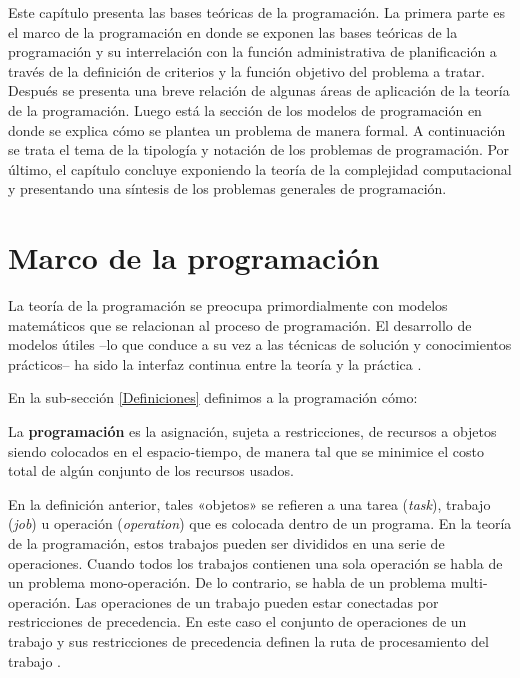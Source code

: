 \documentclass[spanish,draft,12pt,headsepline,footsepline,paper=letter]{scrreprt}
\renewenvironment{quotation}{\list{}{\leftmargin=0.25in}\item[]}{\endlist}
\begin{document}
Este capítulo presenta las bases teóricas de la programación. La primera parte es el marco de la programación en donde se exponen las bases teóricas de la programación y su interrelación con la función administrativa de planificación a través de la definición de criterios y la función objetivo del problema a tratar. Después se presenta una breve relación de algunas áreas de aplicación de la teoría de la programación. Luego está la sección de los modelos de programación en donde se explica cómo se plantea un problema de manera formal. A continuación se trata el tema de la tipología y notación de los problemas de programación. Por último, el capítulo concluye exponiendo la teoría de la complejidad computacional y presentando una síntesis de los problemas generales de programación.

\section{Marco de la programación}

La teoría de la programación se preocupa primordialmente con modelos matemáticos que se relacionan al proceso de programación. El desarrollo de modelos útiles –lo que conduce a su vez a las técnicas de solución y conocimientos prácticos– ha sido la interfaz continua entre la teoría y la práctica \citep[p.~3,~4]{Baker2009}. 

En la sub-sección \ref{Definiciones} definimos a la programación cómo:

\begin{quotation}
La \textbf{programación} es la asignación, sujeta a restricciones, de recursos a objetos siendo colocados en el espacio-tiempo, de manera tal que se minimice el costo total de algún conjunto de los recursos usados.
\end{quotation}

En la definición anterior, tales «objetos» se refieren a una tarea (\textit{task}), trabajo (\textit{job}) u operación (\textit{operation}) que es colocada dentro de un programa. En la teoría de la programación, estos trabajos pueden ser divididos en una serie de operaciones. Cuando todos los trabajos contienen una sola operación se habla de un problema mono-operación. De lo contrario, se habla de un problema multi-operación. Las operaciones de un trabajo pueden estar conectadas por restricciones de precedencia. En este caso el conjunto de operaciones de un trabajo y sus restricciones de precedencia definen la ruta de procesamiento del trabajo \citep[p.~5]{TKindt2002}.
\end{document}
